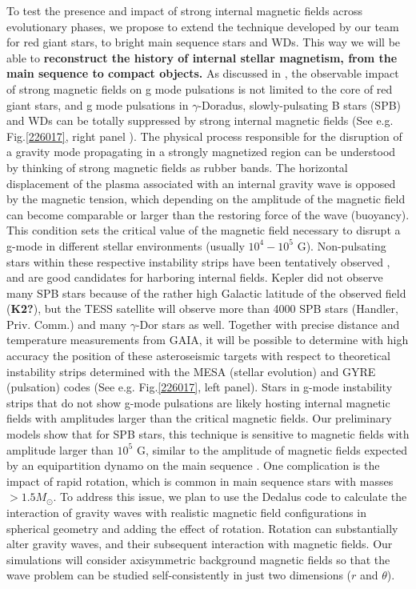 To test the presence and impact of strong internal magnetic fields across evolutionary phases,
we propose to extend the technique developed by our team for red giant stars, to bright main sequence stars and WDs. This way we will be able to \textbf{reconstruct the history of internal stellar magnetism, from the main sequence to compact objects.} As discussed in \citet{Cantiello_2016}, the observable impact of strong magnetic fields on g mode pulsations is not limited to the core of red giant stars, and
 g mode pulsations in $\gamma$-Doradus, slowly-pulsating B stars (SPB) and WDs can be totally suppressed by strong internal magnetic fields (See e.g. Fig.\ref{226017}, right panel ). The physical process responsible for the disruption of a gravity mode propagating in a strongly magnetized region can be understood by thinking of strong magnetic fields as rubber bands. The horizontal displacement of the plasma associated with an internal gravity wave is opposed by the magnetic tension, which depending on the amplitude of the magnetic field can become comparable or larger than the restoring force of the wave (buoyancy). This condition sets the critical value of the magnetic field necessary to disrupt a g-mode in different stellar environments (usually $10^4-10^5$ G). 
Non-pulsating stars within these respective instability strips have been tentatively observed \citep{Balona_2011}, and are good candidates for harboring internal fields.
Kepler did not observe many SPB stars because of the rather high Galactic latitude of the observed field (\textbf{K2?}), but the TESS satellite will observe more than 4000 SPB stars (Handler, Priv. Comm.) and many $\gamma$-Dor stars as well. Together with precise distance and temperature measurements from GAIA, it will be possible to determine with high accuracy the position of these asteroseismic targets with respect to
theoretical instability strips determined with the MESA (stellar evolution) and GYRE (pulsation) codes (See e.g. Fig.\ref{226017}, left panel).
Stars in g-mode instability strips that do not show g-mode pulsations are likely hosting internal magnetic fields with amplitudes larger than the critical
magnetic fields. Our preliminary models show that for SPB stars, this technique is sensitive to magnetic fields with amplitude larger than $10^5$ G,
similar to the amplitude of magnetic fields expected by an equipartition dynamo on the main sequence \citep[See e.g.][]{Featherstone_2009,Augustson_2016}.
One complication is the impact of rapid rotation, which is common in main sequence stars with masses $> 1.5M_\odot$. To address this issue,
we plan to use the Dedalus code to calculate the interaction of gravity waves with realistic magnetic field configurations in spherical geometry \citep[e.g.][]{Braithwaite_2006} 
and adding the effect of rotation. Rotation can substantially alter gravity waves, and their subsequent interaction with magnetic fields. Our simulations will consider axisymmetric background magnetic fields so that the wave problem can be studied self-consistently in just two dimensions ($r$ and $\theta$). 
